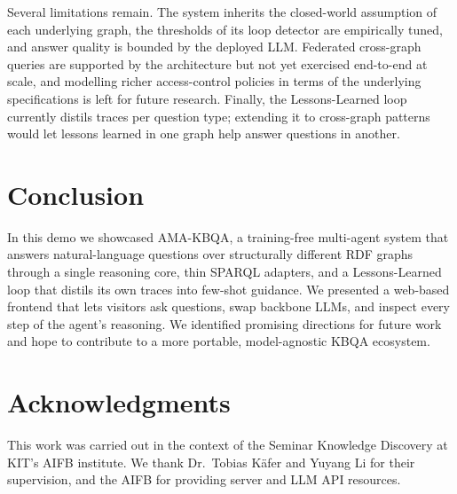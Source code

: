 \documentclass[sigconf,natbib=true]{ceurart}
\begin{document}
Several limitations remain. The system inherits the closed-world
assumption of each underlying graph, the thresholds of its loop
detector are empirically tuned, and answer quality is bounded by the
deployed LLM. Federated cross-graph queries are supported by the
architecture but not yet exercised end-to-end at scale, and
modelling richer access-control policies in terms of the underlying
specifications is left for future research. Finally, the
Lessons-Learned loop currently distils traces per question type;
extending it to cross-graph patterns would let lessons learned in one
graph help answer questions in another.

\section{Conclusion}

In this demo we showcased AMA-KBQA, a training-free multi-agent system
that answers natural-language questions over structurally different
RDF graphs through a single reasoning core, thin SPARQL adapters, and
a Lessons-Learned loop that distils its own traces into few-shot
guidance. We presented a web-based frontend that lets visitors ask
questions, swap backbone LLMs, and inspect every step of the agent's
reasoning. We identified promising directions for future work and
hope to contribute to a more portable, model-agnostic KBQA ecosystem.

\section*{Acknowledgments}

This work was carried out in the context of the Seminar Knowledge
Discovery at KIT's AIFB institute. We thank Dr.\ Tobias K\"afer and
Yuyang Li for their supervision, and the AIFB for providing server
and LLM API resources.


\end{document}
